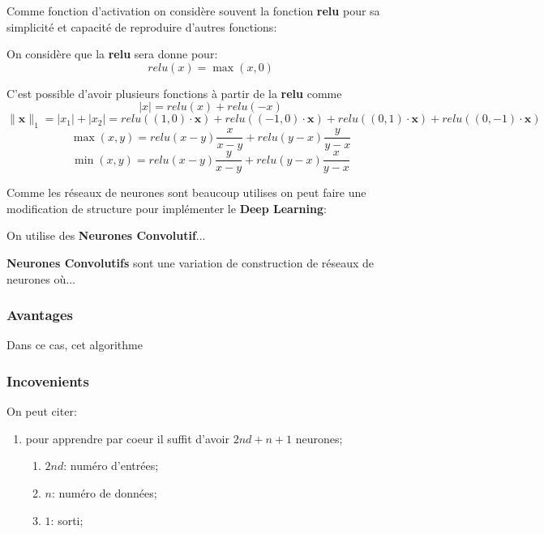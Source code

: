 \documentclass{article}
\begin{document}
Comme fonction d'activation on considère souvent la fonction \textbf{relu} pour sa simplicité et capacité de reproduire d'autres fonctions:
\begin{definition}
    On considère que la \textbf{relu} sera donne pour:
    \begin{equation}
        \boxed{
            relu(x) = \max(x, 0)
        }
    \end{equation}
\end{definition}
C'est possible d'avoir plusieurs fonctions à partir de la \textbf{relu} comme 
\begin{equation}
    |x| = relu(x) + relu(-x)
\end{equation}
\begin{equation}
    \| \mathbf{x}  \|_{1} = |x_{1}| + |x_{2}| = 
    relu((1,0)\cdot\mathbf{x}) + relu((-1,0)\cdot\mathbf{x}) + 
    relu((0,1)\cdot\mathbf{x}) + relu((0,-1)\cdot\mathbf{x})
\end{equation}
\begin{equation}
    \max(x, y) = relu(x-y)\frac{x}{x-y} + relu(y-x)\frac{y}{y-x}
\end{equation}
\begin{equation}
    \min(x, y) = relu(x-y)\frac{y}{x-y} + relu(y-x)\frac{x}{y-x}
\end{equation}

Comme les réseaux de neurones sont beaucoup utilises on peut faire une modification de structure pour implémenter le \textbf{Deep Learning}:
\begin{definition}
    On utilise des \textbf{Neurones Convolutif}...

    \begin{remark}
        \textbf{Neurones Convolutifs} sont une variation de construction de réseaux de neurones où...
    \end{remark}
\end{definition}
\subsubsection{Avantages}
Dans ce cas, cet algorithme 

\subsubsection{Incovenients}
On peut citer:
\begin{enumerate}[noitemsep, rightmargin=\leftmargin]
    \item pour apprendre par coeur il suffit d'avoir $2nd + n + 1$ neurones;
    \begin{enumerate}[noitemsep]
        \item $2nd$: numéro d'entrées;
        \item $n$: numéro de données;
        \item $1$: sorti;
    \end{enumerate} 
\end{enumerate}
\end{document}
